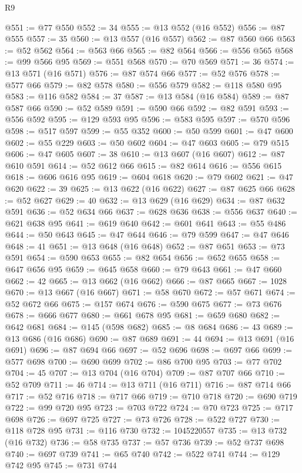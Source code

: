 \begin{lexlean}{R9}
\begin{coremodule}
@551 := @77 @550
@552 := 34
@555 := @13 @552 (@16 @552)
@556 := @87 @555
@557 := 35
@560 := @13 @557 (@16 @557)
@562 := @87 @560 @66
@563 := @52 @562
@564 := @563 @66
@565 := @82 @564
@566 := @556 @565
@568 := @99 @566 @95
@569 := @551 @568
@570 := @70 @569
@571 := 36
@574 := @13 @571 (@16 @571)
@576 := @87 @574 @66
@577 := @52 @576
@578 := @577 @66
@579 := @82 @578
@580 := @556 @579
@582 := @118 @580 @95
@583 := @116 @582
@584 := 37
@587 := @13 @584 (@16 @584)
@589 := @87 @587 @66
@590 := @52 @589
@591 := @590 @66
@592 := @82 @591
@593 := @556 @592
@595 := @129 @593 @95
@596 := @583 @595
@597 := @570 @596
@598 := @517 @597
@599 := @55 @352
@600 := @50 @599
@601 := @47 @600
@602 := @55 @229
@603 := @50 @602
@604 := @47 @603
@605 := @79 @515
@606 := @47 @605
@607 := 38
@610 := @13 @607 (@16 @607)
@612 := @87 @610 @591
@614 := @52 @612 @66
@615 := @82 @614
@616 := @556 @615
@618 := @606 @616 @95
@619 := @604 @618
@620 := @79 @602
@621 := @47 @620
@622 := 39
@625 := @13 @622 (@16 @622)
@627 := @87 @625 @66
@628 := @52 @627
@629 := 40
@632 := @13 @629 (@16 @629)
@634 := @87 @632 @591
@636 := @52 @634 @66
@637 := @628 @636
@638 := @556 @637
@640 := @621 @638 @95
@641 := @619 @640
@642 := @601 @641
@643 := @55 @486
@644 := @50 @643
@645 := @47 @644
@646 := @79 @599
@647 := @47 @646
@648 := 41
@651 := @13 @648 (@16 @648)
@652 := @87 @651
@653 := @73 @591
@654 := @590 @653
@655 := @82 @654
@656 := @652 @655
@658 := @647 @656 @95
@659 := @645 @658
@660 := @79 @643
@661 := @47 @660
@662 := 42
@665 := @13 @662 (@16 @662)
@666 := @87 @665
@667 := 1028
@670 := @13 @667 (@16 @667)
@671 := @58 @670
@672 := @57 @671
@674 := @52 @672 @66
@675 := @157 @674
@676 := @590 @675
@677 := @73 @676
@678 := @666 @677
@680 := @661 @678 @95
@681 := @659 @680
@682 := @642 @681
@684 := @145 (@598 @682)
@685 := @8 @684
@686 := 43
@689 := @13 @686 (@16 @686)
@690 := @87 @689
@691 := 44
@694 := @13 @691 (@16 @691)
@696 := @87 @694 @66
@697 := @52 @696
@698 := @697 @66
@699 := @577 @698
@700 := @690 @699
@702 := @86 @700 @95
@703 := @77 @702
@704 := 45
@707 := @13 @704 (@16 @704)
@709 := @87 @707 @66
@710 := @52 @709
@711 := 46
@714 := @13 @711 (@16 @711)
@716 := @87 @714 @66
@717 := @52 @716
@718 := @717 @66
@719 := @710 @718
@720 := @690 @719
@722 := @99 @720 @95
@723 := @703 @722
@724 := @70 @723
@725 := @717 @698
@726 := @697 @725
@727 := @73 @726
@728 := @522 @727
@730 := @118 @728 @95
@731 := @116 @730
@732 := 1045220557
@735 := @13 @732 (@16 @732)
@736 := @58 @735
@737 := @57 @736
@739 := @52 @737 @698
@740 := @697 @739
@741 := @65 @740
@742 := @522 @741
@744 := @129 @742 @95
@745 := @731 @744

\end{coremodule}
\end{lexlean}
